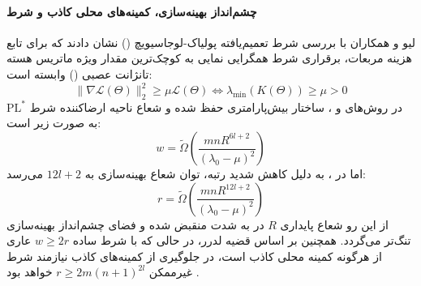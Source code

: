 \paragraph*{چشم‌انداز بهینه‌سازی، کمینه‌های محلی کاذب و شرط }
لیو و همکاران \cite{liu2025optimization} با بررسی شرط تعمیم‌یافته پولیاک-لوجاسیویچ () نشان دادند که برای تابع هزینه مربعات، برقراری شرط همگرایی نمایی به کوچک‌ترین مقدار ویژه ماتریس هسته تانژانت عصبی () وابسته است:
\begin{equation}
    \|\nabla \mathcal{L}(\Theta)\|_2^2 \ge \mu \mathcal{L}(\Theta) \iff \lambda_{\min}(K(\Theta)) \ge \mu > 0
\end{equation}
در روش‌های  و ، ساختار بیش‌پارامتری حفظ شده و شعاع ناحیه ارضا‌کننده شرط $\text{PL}^*$ به صورت زیر است:
\begin{equation}
    w = \tilde{\Omega}\left( \frac{mn R^{6l+2}}{(\lambda_0 - \mu)^2} \right)
\end{equation}
اما در ، به دلیل کاهش شدید رتبه، توان شعاع بهینه‌سازی به $12l+2$ می‌رسد:
\begin{equation}
    r = \tilde{\Omega}\left( \frac{mn R^{12l+2}}{(\lambda_0 - \mu)^2} \right)
\end{equation}
از این رو شعاع پایداری $R$ در  به شدت منقبض شده و فضای چشم‌انداز بهینه‌سازی تنگ‌تر می‌گردد. همچنین بر اساس قضیه لدرر، در حالی که  با شرط ساده $w \ge 2r$ عاری از هرگونه کمینه محلی کاذب است، در  جلوگیری از کمینه‌های کاذب نیازمند شرط غیرممکن $r \ge 2m(n+1)^{2l}$ خواهد بود \cite{liu2025optimization}.

